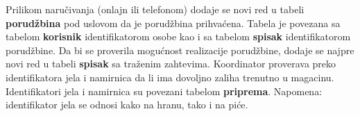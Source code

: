 Prilikom naručivanja (onlajn ili telefonom) dodaje se novi red u tabeli \textbf{porudžbina} pod uslovom da je porudžbina prihvaćena. Tabela je povezana sa tabelom \textbf{korisnik} identifikatorom osobe kao i sa tabelom \textbf{spisak} identifikatorom porudžbine. Da bi se proverila mogućnost realizacije porudžbine, dodaje se najpre novi red u tabeli \textbf{spisak} sa traženim zahtevima. Koordinator proverava preko identifikatora jela i namirnica da li ima dovoljno zaliha trenutno u magacinu. Identifikatori jela i namirnica su povezani tabelom \textbf{priprema}. Napomena: identifikator jela se odnosi kako na hranu, tako i na piće.